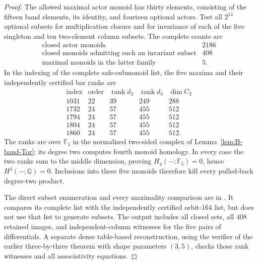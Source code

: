 \begin{proof}
The allowed maximal actor monoid has thirty elements, consisting
of the fifteen band elements, its identity, and fourteen optional
actors.  Test all $2^{14}$ optional subsets for multiplication
closure and for invariance of each of the five singleton and ten
two-element column subsets.  The complete counts are
\[
 \begin{array}{l|r}
 \text{closed actor monoids}&2186\\
 \text{closed monoids admitting such an invariant subset}&408\\
 \text{maximal monoids in the latter family}&5.
 \end{array}
\]
In the indexing of the complete safe-submonoid list, the five
maxima and their independently certified bar ranks are
\[
 \begin{array}{c|r|r|r|r}
 \text{index}&\text{order}&\operatorname{rank}d_2&
 \operatorname{rank}d_3&\dim C_2\\\hline
 1031&22&39&249&288\\
 1732&24&57&455&512\\
 1794&24&57&455&512\\
 1804&24&57&455&512\\
 1860&24&57&455&512.
 \end{array}
\]
The ranks are over $\mathbb F_5$ in the normalized two-sided
complex of Lemma~\ref{lem:B-band-Tor}; its degree two computes
fourth monoid homology.  In every case the two ranks sum to
the middle dimension, proving $H_4(-;\mathbb F_5)=0$, hence
$H^4(-;\mathbb Q)=0$.  Inclusions into these five monoids
therefore kill every pulled-back degree-two product.

The direct subset enumeration and every maximality comparison are
in .  It compares its
complete list with the independently certified orbit-$164$ list,
but does not use that list to generate subsets.  The output
 includes
all closed sets, all $408$ retained images, and independent-column
witnesses for the five pairs of differentials.  A separate dense
table-based reconstruction, using the verifier of the earlier
three-by-three theorem with shape parameters $(3,5)$, checks
those rank witnesses and all associativity equations.
\end{proof}

